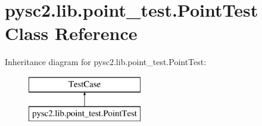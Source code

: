 \hypertarget{classpysc2_1_1lib_1_1point__test_1_1_point_test}{}\section{pysc2.\+lib.\+point\+\_\+test.\+Point\+Test Class Reference}
\label{classpysc2_1_1lib_1_1point__test_1_1_point_test}
Inheritance diagram for pysc2.\+lib.\+point\+\_\+test.\+Point\+Test\+:\begin{figure}[H]
\begin{center}
\leavevmode
\includegraphics[height=2.000000cm]{classpysc2_1_1lib_1_1point__test_1_1_point_test}
\end{center}
\end{figure}

